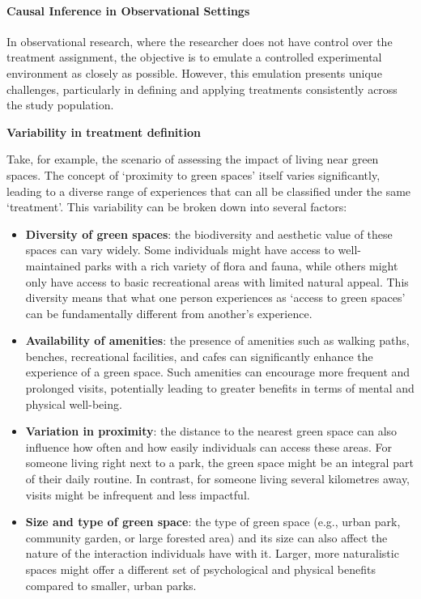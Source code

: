 \documentclass[
  singlecolumn]{article}
\let\oldparagraph\paragraph
\renewcommand{\paragraph}[1]{\oldparagraph{#1}\mbox{}}
\begin{document}
\paragraph{Causal Inference in Observational
Settings}\label{causal-inference-in-observational-settings}

In observational research, where the researcher does not have control
over the treatment assignment, the objective is to emulate a controlled
experimental environment as closely as possible. However, this emulation
presents unique challenges, particularly in defining and applying
treatments consistently across the study population.

\textbf{Variability in treatment definition}

Take, for example, the scenario of assessing the impact of living near
green spaces. The concept of `proximity to green spaces' itself varies
significantly, leading to a diverse range of experiences that can all be
classified under the same `treatment'. This variability can be broken
down into several factors:

\begin{itemize}
\item
  \textbf{Diversity of green spaces}: the biodiversity and aesthetic
  value of these spaces can vary widely. Some individuals might have
  access to well-maintained parks with a rich variety of flora and
  fauna, while others might only have access to basic recreational areas
  with limited natural appeal. This diversity means that what one person
  experiences as `access to green spaces' can be fundamentally different
  from another's experience.
\item
  \textbf{Availability of amenities}: the presence of amenities such as
  walking paths, benches, recreational facilities, and cafes can
  significantly enhance the experience of a green space. Such amenities
  can encourage more frequent and prolonged visits, potentially leading
  to greater benefits in terms of mental and physical well-being.
\item
  \textbf{Variation in proximity}: the distance to the nearest green
  space can also influence how often and how easily individuals can
  access these areas. For someone living right next to a park, the green
  space might be an integral part of their daily routine. In contrast,
  for someone living several kilometres away, visits might be infrequent
  and less impactful.
\item
  \textbf{Size and type of green space}: the type of green space (e.g.,
  urban park, community garden, or large forested area) and its size can
  also affect the nature of the interaction individuals have with it.
  Larger, more naturalistic spaces might offer a different set of
  psychological and physical benefits compared to smaller, urban parks.
\end{itemize}
\end{document}
